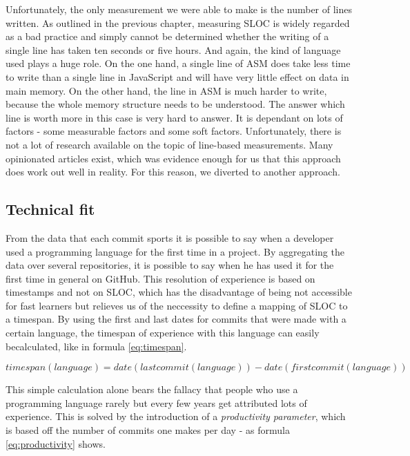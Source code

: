 Unfortunately, the only measurement we were able to make is the number of lines written.
As outlined in the previous chapter, measuring SLOC is widely regarded as a bad practice
and simply cannot be determined whether the writing of a single line has taken
ten seconds or five hours. And again, the kind of language used plays a huge role.
On the one hand, a single line of ASM does take less time to write than a single line in JavaScript
and will have very little effect on data in main memory. On the other hand, the line
in ASM is much harder to write, because the whole memory structure needs to be understood.
The answer which line is worth more in this case is very hard to answer.
It is dependant on lots of factors - some measurable factors and some soft factors.
Unfortunately, there is not a lot of research available on the topic of line-based
measurements. Many opinionated articles exist, which was evidence enough for us
that this approach does work out well in reality. For this reason, we diverted to another approach.

\subsection{Technical fit}
From the data that each commit sports it is possible to say when a developer
used a programming language for the first time in a project.
By aggregating the data over several repositories, it is possible to say when
he has used it for the first time in general on GitHub.
This resolution of experience is based on timestamps and not on SLOC,
which has the disadvantage of being not accessible for fast learners
but relieves us of the neccessity to define a mapping of SLOC to a timespan.
By using the first and last dates for commits that were made with a certain language,
the timespan of experience with this language can easily becalculated, like in
formula \ref{eq:timespan}.

\begin{equation}
timespan(language) = date(lastcommit(language)) - date(firstcommit(language))
\label{eq:timespan}
\end{equation}

This simple calculation alone bears the fallacy that people who use a
programming language rarely but every few years get attributed lots
of experience. This is solved by the introduction of a \textit{productivity parameter},
which is based off the number of commits one makes per day - as formula \ref{eq:productivity} shows.

